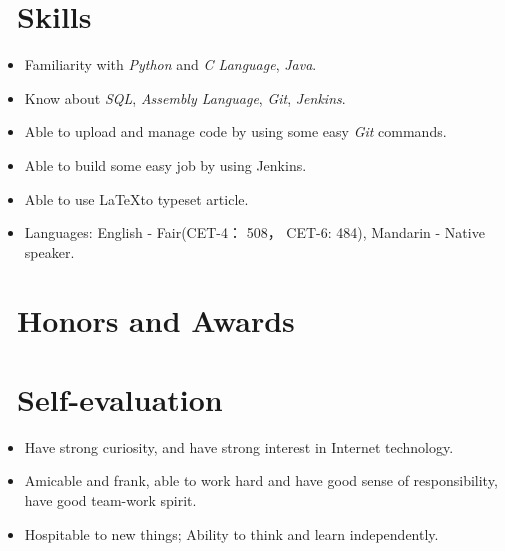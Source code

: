 \documentclass{resume}
\begin{document}
\section{\faCogs\ Skills}
\begin{itemize}[parsep=1ex]
  \item Familiarity with \emph{Python} and \emph{C Language}, \emph{Java}.
  \item Know about  \emph{SQL}, \emph{Assembly Language},  \emph{Git}, \emph{Jenkins}. 
  \item Able to upload and manage code by using some easy \emph{Git} commands.
  \item Able to build some easy job by using Jenkins.
  \item Able to use \LaTeX to typeset article.
  \item Languages: English - Fair(CET-4： 508， CET-6: 484), Mandarin - Native speaker.
\end{itemize}

\section{\faHeartO\ Honors and Awards}
\begin{itemize}

\end{itemize}
\section{\faInfo\ Self-evaluation}
\begin{itemize}[parsep=1ex]
  \item Have strong curiosity, and have strong interest in Internet technology.
  \item Amicable and frank, able to work hard and have good sense of responsibility, have good team-work spirit.
  \item Hospitable to new things; Ability to think and learn independently.
\end{itemize}

%
%
\end{document}
